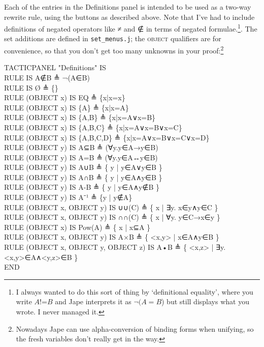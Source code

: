 Each of the entries in the Definitions panel is intended to be used as a two-way rewrite rule, using the buttons as described above. Note that I've had to include definitions of negated operators like ≠ and ∉ in terms of negated formulae.\footnote{I always wanted to do this sort of thing by `definitional equality', where you write $A$!=$B$ and Jape interprets it as $¬(A=B$) but still displays what you wrote. I never managed it.}. The set additions are defined in \texttt{set\_menus.j}; the \textsc{object} qualifiers are for convenience, so that you don't get too many unknowns in your proof:\footnote{Nowadays Jape can use alpha-conversion of binding forms when unifying, so the fresh variables don't really get in the way.}
\begin{japeish}
TACTICPANEL "Definitions" IS \\
\tab RULE IS A∉B ≜ ¬(A∈B) \\
\tab RULE IS Ø ≜ \{\} \\
\tab RULE (OBJECT x) IS EQ ≜ \{x|x=x\} \\
\tab RULE (OBJECT x) IS \{A\} ≜ \{x|x=A\} \\
\tab RULE (OBJECT x) IS \{A,B\} ≜ \{x|x=A∨x=B\} \\
\tab RULE (OBJECT x) IS \{A,B,C\} ≜ \{x|x=A∨x=B∨x=C\} \\
\tab RULE (OBJECT x) IS \{A,B,C,D\} ≜ \{x|x=A∨x=B∨x=C∨x=D\} \\
\tab RULE (OBJECT y) IS A⊆B ≜ (∀y.y∈A→y∈B) \\
\tab RULE (OBJECT y) IS A=B ≜ (∀y.y∈A↔y∈B) \\
\tab RULE (OBJECT y) IS A∪B ≜ \{ y | y∈A∨y∈B \} \\
\tab RULE (OBJECT y) IS A∩B ≜ \{ y | y∈A∧y∈B \} \\
\tab RULE (OBJECT y) IS A-B ≜ \{ y | y∈A∧y∉B \} \\
\tab RULE (OBJECT y) IS A⁻¹ ≜ \{y | y∉A\} \\
\tab RULE (OBJECT x, OBJECT y) IS ∪∪(C) ≜ \{ x | ∃y. x∈y∧y∈C \} \\
\tab RULE (OBJECT x, OBJECT y) IS ∩∩(C) ≜ \{ x | ∀y. y∈C→x∈y \} \\
\tab RULE (OBJECT x) IS Pow(A) ≜ \{ x | x⊆A \} \\
\tab RULE (OBJECT x, OBJECT y) IS A×B ≜ \{ <x,y>  | x∈A∧y∈B \} \\
\tab RULE (OBJECT x, OBJECT y, OBJECT z) IS A•B ≜ \{ <x,z> | ∃y.<x,y>∈A∧<y,z>∈B \} \\
END
\end{japeish}

